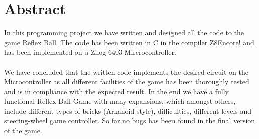 \chapter{Abstract}

In this programming project we have written and designed all the code to the game Reflex Ball. The code has been written in C in the compiler Z8Encore! and has been implemented on a Zilog 6403 Mircrocontroller. \\ \\
We have concluded that the written code implements the desired circuit on the Microcontroller as all different facilities of the game has been thoroughly tested and is in compliance with the expected result. In the end we have a fully functional Reflex Ball Game with many expansions, which amongst others, include different types of bricks (Arkanoid style), difficulties, different levels and steering-wheel game controller. So far no bugs has been found in the final version of the game.
